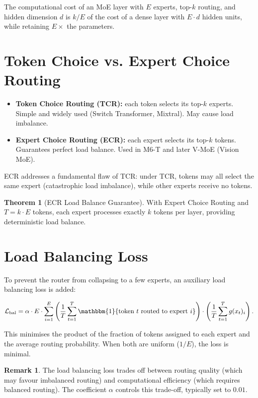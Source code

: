 \documentclass[11pt,a4paper]{book}
\theoremstyle{definition}
\newtheorem{theorem}{Theorem}[chapter]
\newtheorem{remark}{Remark}[chapter]
\begin{document}
The computational cost of an MoE layer with $E$ experts, top-$k$ routing, and hidden dimension $d$ is $k/E$ of the cost of a dense layer with $E \cdot d$ hidden units, while retaining $E \times$ the parameters.

\section{Token Choice vs. Expert Choice Routing}

\begin{itemize}
	\item \textbf{Token Choice Routing (TCR):} each token selects its top-$k$ experts. Simple and widely used (Switch Transformer, Mixtral). May cause load imbalance.
	\item \textbf{Expert Choice Routing (ECR):} each expert selects its top-$k$ tokens. Guarantees perfect load balance. Used in M6-T and later V-MoE (Vision MoE).
\end{itemize}

ECR addresses a fundamental flaw of TCR: under TCR, tokens may all select the same expert (catastrophic load imbalance), while other experts receive no tokens.

\begin{theorem}[ECR Load Balance Guarantee]
	With Expert Choice Routing and $T = k \cdot E$ tokens, each expert processes exactly $k$ tokens per layer, providing deterministic load balance.
\end{theorem}

\section{Load Balancing Loss}

To prevent the router from collapsing to a few experts, an auxiliary load balancing loss is added:

\begin{equation}
	\mathcal{L}_{\text{bal}} = \alpha \cdot E \cdot \sum_{i=1}^E \left( \frac{1}{T} \sum_{t=1}^T \mathbbm{1}\{\text{token } t \text{ routed to expert } i\} \right) \cdot \left( \frac{1}{T} \sum_{t=1}^T g(x_t)_i \right).
\end{equation}

This minimises the product of the fraction of tokens assigned to each expert and the average routing probability. When both are uniform ($1/E$), the loss is minimal.

\begin{remark}
	The load balancing loss trades off between routing quality (which may favour imbalanced routing) and computational efficiency (which requires balanced routing). The coefficient $\alpha$ controls this trade-off, typically set to $0.01$.
\end{remark}
\end{document}
